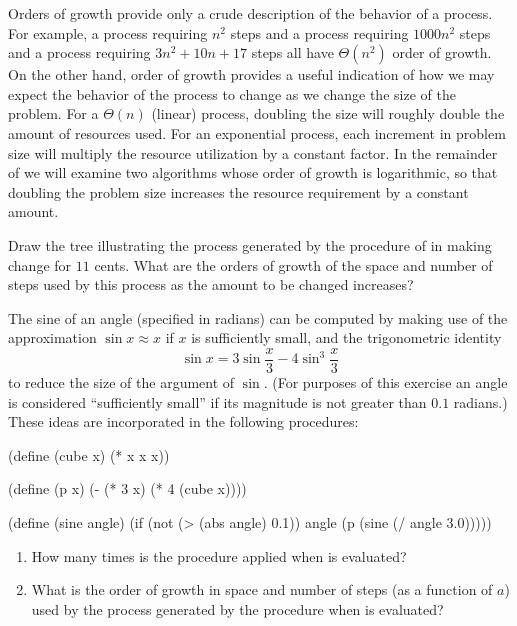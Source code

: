 Orders of growth provide only a crude description of the behavior of a process.
For example, a process requiring \( n^2 \) steps and a process requiring \( 1000 n^2 \) steps and a process requiring \( 3 n^2 + 10 n + 17 \) steps all have \( Θ(n^2) \) order of growth.
On the other hand, order of growth provides a useful indication of how we may expect the behavior of the process to change as we change the size of the problem.
For a \( Θ(n) \) (linear) process, doubling the size will roughly double the amount of resources used.
For an exponential process, each increment in problem size will multiply the resource utilization by a constant factor.
In the remainder of  we will examine two algorithms whose order of growth is logarithmic, so that doubling the problem size increases the resource requirement by a constant amount.



\begin{exercise}
	\label{Exercise 1.14}
	Draw the tree illustrating the process generated by the  procedure of  in making change for \( 11 \) cents.
	What are the orders of growth of the space and number of steps used by this process as the amount to be changed increases?
\end{exercise}



\begin{exercise}
	\label{Exercise 1.15}
	The sine of an angle (specified in radians) can be computed by making use of the approximation \( \sin x ≈ x \) if \( x \) is sufficiently small, and the trigonometric identity
	\[
		\sin x = 3 \sin \frac{x}{3} - 4 \sin^3 \frac{x}{3}
	\]
	to reduce the size of the argument of \( \sin \).
	(For purposes of this exercise an angle is considered “sufficiently small” if its magnitude is not greater than \( 0.1 \) radians.)
	These ideas are incorporated in the following procedures:
	\begin{scheme}
	  (define (cube x) (* x x x))

	  (define (p x) (- (* 3 x) (* 4 (cube x))))

	  (define (sine angle)
	    (if (not (> (abs angle) 0.1))
	        angle
	        (p (sine (/ angle 3.0)))))
	\end{scheme}
	\begin{enumerate}[label = \alph*., leftmargin = *]

		\item
			How many times is the procedure  applied when  is evaluated?

		\item
			What is the order of growth in space and number of steps (as a function of \( a \)) used by the process generated by the  procedure when  is evaluated?

	\end{enumerate}
\end{exercise}
